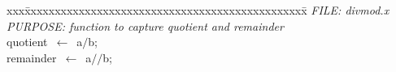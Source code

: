 \documentclass{report}
\begin{document}
\pagestyle{empty}
\begin{tabbing}
xxx\=xxxxxxxxxxxxxxxxxxxxxxxxxxxxxxxxxxxxxxxxxxxxxxx\=\kill
{\tt{}}{\em{} FILE:    divmod.x
}\\
{\tt{}}{\em{} PURPOSE: function to capture quotient and remainder
}\\
quotient\ $\leftarrow$\ a$/$b;\\
remainder\ $\leftarrow$\ a$/\!\!/$b;\\
\end{tabbing}
\end{document}
